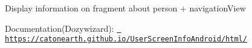 Display information on fragment about person + navigation\+View

Documentation(\+Dozywizard)\+: \href{https://catonearth.github.io/UserScreenInfoAndroid/html/}{\texttt{ https\+://catonearth.\+github.\+io/\+User\+Screen\+Info\+Android/html/}}

 